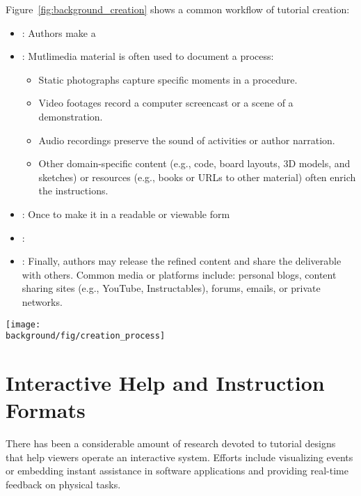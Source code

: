 
Figure~\ref{fig:background_creation} shows a common workflow of tutorial creation:

\begin{itemize}
  \item {}:
    Authors make a
  \item {}:
    Mutlimedia material is often used to document a process:
    \begin{itemize}
      \itemsep -2pt
      \item Static photographs capture specific moments in a procedure.
      \item Video footages record a computer screencast or a scene of a demonstration.
      \item Audio recordings preserve the sound of activities or author narration.
      \item Other domain-specific content (e.g., code, board layouts, 3D models, and sketches) or resources (e.g., books or URLs to other material) often enrich the instructions.
    \end{itemize}
  \item {}:
    Once  to make it in a readable or viewable form
  \item {}:
  \item {}:
    Finally, authors may release the refined content and share the deliverable with others. Common media or platforms include: personal blogs, content sharing sites (e.g., YouTube, Instructables), forums, emails, or private networks.
\end{itemize}

\begin{figure*}[t]
  \centering
  \texttt{[image: \\background/fig/creation\_process]}
  \caption{A common workflow of tutorial creation. }
  \label{fig:background_creation}
\end{figure*}


\section{Interactive Help and Instruction Formats}
\label{background_format}

There has been a considerable amount of research devoted to tutorial designs that help viewers operate an interactive system. Efforts include visualizing events or embedding instant assistance in software applications and providing real-time feedback on physical tasks.

